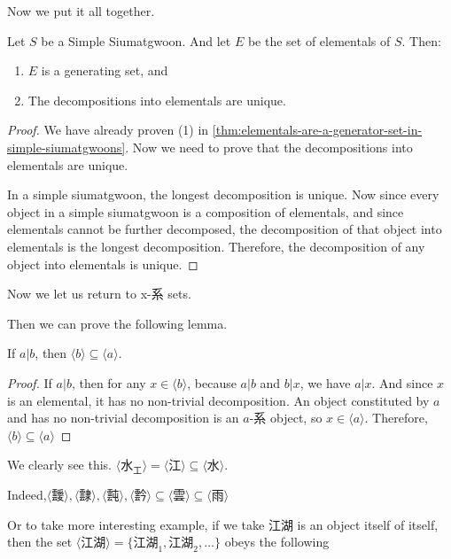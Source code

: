 Now we put it all together.
\begin{theorem}
    Let $S$ be a Simple Siumatgwoon. And let $E$ be the set of elementals of $S$. Then: 
    \begin{enumerate}
        \item $E$ is a generating set, and 
        \item The decompositions into elementals are unique.
    \end{enumerate}
\end{theorem}
\begin{proof}
    We have already proven (1) in \ref{thm:elementals-are-a-generator-set-in-simple-siumatgwoons}. Now we need to prove that the decompositions into elementals are unique.

    In a simple siumatgwoon, the longest decomposition is unique. Now since every object in a simple siumatgwoon is a composition of elementals, and since elementals cannot be further decomposed, the decomposition of that object into elementals is the longest decomposition. Therefore, the decomposition of any object into elementals is unique.
\end{proof}


Now we let us return to x-系 sets.



Then we can prove the following lemma. 
\begin{lemma}[X-系 is a Siumatgwoon]\label{lem:hais-of-sets-are-siumatgwoons}
    If $a|b$, then $ \langle b \rangle \subseteq \langle a \rangle$.
\end{lemma}
\begin{proof}
    If $a|b$, then for any $x\in \langle b \rangle$, because $a|b$ and $b|x$, we have $a|x$. And since $x$ is an elemental, it has no non-trivial decomposition. An object constituted by $a$ and has no non-trivial decomposition is an $a$-系 object, so $x \in \langle a \rangle$. Therefore, $\langle b \rangle \subseteq \langle a \rangle$
\end{proof}

We clearly see this. $
\langle \text{水}_\text{工} \rangle = \langle \text{江} \rangle \subseteq
\langle \text{水} \rangle$. 

Indeed,$\langle \text{靉} \rangle, \langle \text{霴} \rangle, \langle \text{霕} \rangle, \langle \text{霒} \rangle \subseteq \langle \text{雲} \rangle \subseteq \langle \text{雨} \rangle$

Or to take more interesting example, if we take $\text{江湖}$ is an object itself of itself, then the set $\langle \text{江湖} \rangle = \{\text{江湖}_{1}, \text{江湖}_{2}, \ldots\}$ obeys the following 


